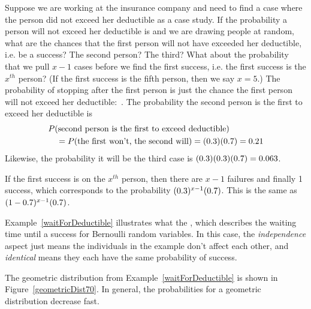 \begin{examplewrap}
\begin{nexample}{Suppose we are working at the insurance
    company and need to find a case where the person did
    not exceed her deductible as a case study.
    If the probability a person will not exceed her
    deductible is \insureSprob{} and we are drawing people
    at random, what are the chances that the first person
    will not have exceeded her deductible, i.e. be a success?
    The second person?
    The third?
    What about the probability that we pull $x - 1$ cases before we find
    the first success, i.e. the first success is the
    $x^{th}$ person?
    (If the first success is the fifth person, then we say $x=5$.)}
  \label{waitForDeductible}%
  The probability of stopping after the first person is just
  the chance the first person will not exceed her deductible:~\insureSprob{}.
The probability the second person is the first to exceed
  her deductible is  \begin{align*}
  &P(\text{second person is the first to exceed deductible})  \\
  &\quad
    = P(\text{the first won't, the second will})
    = (0.3{})(0.7{})
    = 0.21{}
  \end{align*}
  Likewise, the probability it will be the third case is
  $(0.3{})(0.3{})(0.7{})
    = 0.063$.

  If the first success is on the $x^{th}$ person,
  then there are $x-1$ failures and finally 1 success,
  which corresponds to the probability
  $(0.3{})^{x-1}(0.7{})$.
  This is the same as
  $(1-0.7{})^{x-1}(0.7{})$.
\end{nexample}
\end{examplewrap}


Example~\ref{waitForDeductible} illustrates what the
,
which describes the waiting
time until a success for
Bernoulli random variables.
In this case, the \emph{independence} aspect just means
the individuals in the example don't affect each other,
and \emph{identical} means they each have the same probability
of success.

The geometric distribution from Example~\ref{waitForDeductible} is shown in Figure~\ref{geometricDist70}. In general, the probabilities for a geometric distribution decrease  fast.

